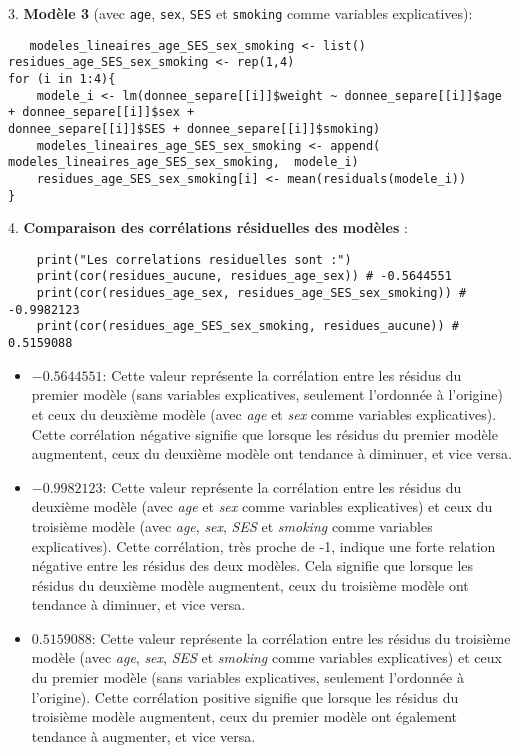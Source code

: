 \documentclass[../main.tex]{subfiles}
\begin{document}
\begin{CJK*}{UTF8}{gbsn}
\begin {lstlisting}[language=R]
   \end{lstlisting}

3. \textbf{Modèle 3} (avec \texttt{age}, \texttt{sex}, \texttt{SES} et \texttt{smoking} comme variables explicatives):

\begin{lstlisting}
   modeles_lineaires_age_SES_sex_smoking <- list()
residues_age_SES_sex_smoking <- rep(1,4)
for (i in 1:4){
    modele_i <- lm(donnee_separe[[i]]$weight ~ donnee_separe[[i]]$age + donnee_separe[[i]]$sex + 
donnee_separe[[i]]$SES + donnee_separe[[i]]$smoking)
    modeles_lineaires_age_SES_sex_smoking <- append(
modeles_lineaires_age_SES_sex_smoking,  modele_i)
    residues_age_SES_sex_smoking[i] <- mean(residuals(modele_i))
}
\end{lstlisting}

4. \textbf{Comparaison des corrélations résiduelles des modèles} :

\begin{lstlisting}
    print("Les correlations residuelles sont :")
    print(cor(residues_aucune, residues_age_sex)) # -0.5644551
    print(cor(residues_age_sex, residues_age_SES_sex_smoking)) # -0.9982123
    print(cor(residues_age_SES_sex_smoking, residues_aucune)) # 0.5159088
\end{lstlisting}

\begin{itemize}
    \item \(-0.5644551\): Cette valeur représente la corrélation entre les résidus du premier modèle (sans variables explicatives, seulement l'ordonnée à l'origine) et ceux du deuxième modèle (avec \textit{age} et \textit{sex} comme variables explicatives). Cette corrélation négative signifie que lorsque les résidus du premier modèle augmentent, ceux du deuxième modèle ont tendance à diminuer, et vice versa.
    
    \item \(-0.9982123\): Cette valeur représente la corrélation entre les résidus du deuxième modèle (avec \textit{age} et \textit{sex} comme variables explicatives) et ceux du troisième modèle (avec \textit{age}, \textit{sex}, \textit{SES} et \textit{smoking} comme variables explicatives). Cette corrélation, très proche de -1, indique une forte relation négative entre les résidus des deux modèles. Cela signifie que lorsque les résidus du deuxième modèle augmentent, ceux du troisième modèle ont tendance à diminuer, et vice versa.
    
    \item \(0.5159088\): Cette valeur représente la corrélation entre les résidus du troisième modèle (avec \textit{age}, \textit{sex}, \textit{SES} et \textit{smoking} comme variables explicatives) et ceux du premier modèle (sans variables explicatives, seulement l'ordonnée à l'origine). Cette corrélation positive signifie que lorsque les résidus du troisième modèle augmentent, ceux du premier modèle ont également tendance à augmenter, et vice versa.
\end{itemize}


\end{CJK*}
\end{document}

